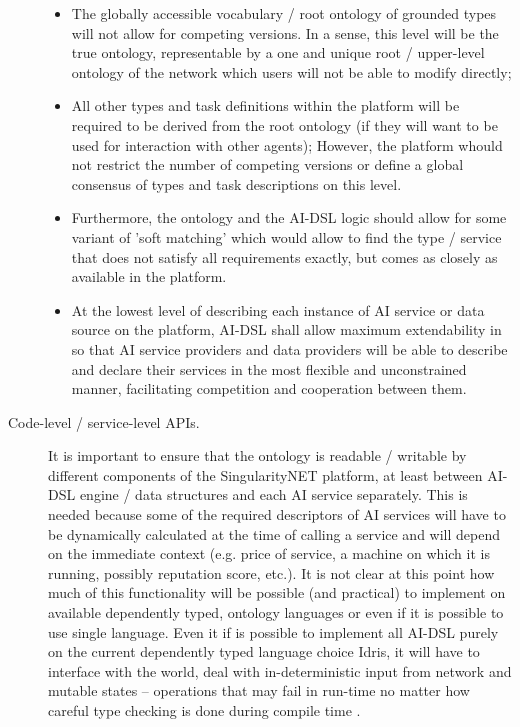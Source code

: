 \documentclass[]{report}
\begin{document}
\begin{description}
  \begin{itemize} \item The globally accessible vocabulary / root ontology of
  grounded types will not allow for competing versions. In a sense, this level
  will be the true ontology, representable by a one and unique root /
  upper-level ontology of the network which users will not be able to modify
  directly; \item All other types and task definitions within the platform will
  be required to be derived from the root ontology (if they will want to be used
  for interaction with other agents); However, the platform whould not restrict
  the number of competing versions or define a global consensus  of types and
  task descriptions on this level. \item Furthermore, the ontology and the
  AI-DSL logic should allow for some variant of 'soft matching' which would
  allow to find the type / service that does not satisfy all requirements
  exactly, but comes as closely as available in the platform. \item At the
  lowest level of describing each instance of AI service or data source on the
  platform, AI-DSL shall allow maximum extendability in so that AI service
  providers and data providers will be able to describe and declare their
  services in the most flexible and unconstrained manner, facilitating
  competition and cooperation between them. \end{itemize}

  \item[Code-level / service-level APIs.] It is important to ensure that the
  ontology is readable / writable by different components of the SingularityNET
  platform, at least between AI-DSL engine / data structures and each AI service
  separately. This is needed because some of the required descriptors of AI
  services will have to be dynamically calculated at the time of calling a
  service and will depend on the immediate context (e.g. price of service, a
  machine on which it is running, possibly reputation score, etc.). It is not
  clear at this point how much of this functionality will be possible (and
  practical) to implement on available dependently typed, ontology languages or
  even if it is possible to use single language. Even it if is possible to
  implement all AI-DSL purely on the current dependently typed language choice
  Idris, it will have to interface with the world, deal with in-deterministic
  input from network and mutable states -- operations that may fail in run-time
  no matter how careful type checking is done during compile time
  \cite{brady_resource-dependent_2015}.


\end{description}
\end{document}
